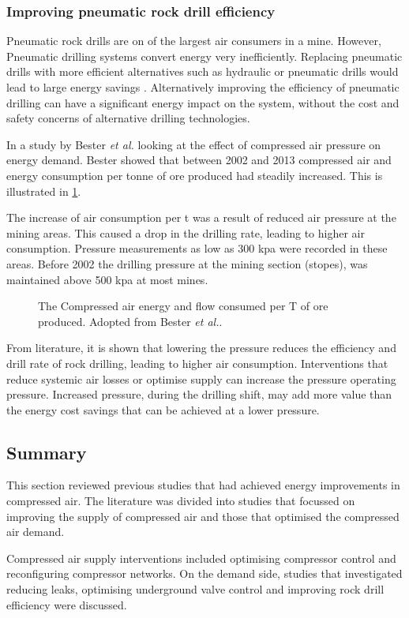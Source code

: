 		\subsubsection{Improving pneumatic rock drill efficiency}
		 Pneumatic rock drills are on of the largest air consumers in a mine. However, Pneumatic drilling systems convert energy very inefficiently. Replacing pneumatic drills with more efficient alternatives such as hydraulic or pneumatic drills would lead to large energy savings \cite{Pascoe2016Masters}. Alternatively improving the efficiency of pneumatic drilling can have a significant energy impact on the system, without the cost and safety concerns of alternative drilling technologies.
		 \par 
		 In a study by Bester \textit{et al.} \cite{bester2013effect} looking at the effect of compressed air pressure on energy demand. Bester showed that between 2002 and 2013 compressed air and energy consumption per tonne of ore produced had steadily increased. This is illustrated in \cref{fig: Compressed energy and air flow per ton}. 
		 \par
		 The increase of air consumption per \gls{t} was a result of reduced air pressure at the mining areas. This caused a drop in the drilling rate, leading to higher air consumption. Pressure measurements as low as 300 \gls{kpa} were recorded in these areas. Before 2002 the drilling pressure at the mining section (stopes), was maintained above 500 \gls{kpa} at most mines. 
		 \par 
		 \begin{figure}[h]
		 	\centering
		 	
		 	\caption[The Compressed air energy and flow consumed per T of ore produced.]{The Compressed air energy and flow consumed per T of ore produced. Adopted from Bester \textit{et al.}\cite{bester2013effect}.}
		 	\label{fig: Compressed energy and air flow per ton}
		 \end{figure}
		 From literature, it is shown that lowering the pressure reduces the efficiency and drill rate of rock drilling, leading to higher air consumption. Interventions that reduce systemic air losses or optimise supply can increase the pressure operating pressure. Increased pressure, during the drilling shift, may add more value than the energy cost savings that can be achieved at a lower pressure.
	\subsection{Summary}
	This section reviewed previous studies that had achieved energy improvements in compressed air. The literature was divided into studies that focussed on improving the supply of compressed air and those that optimised the compressed air demand.
	\par
	Compressed air supply interventions included optimising compressor control and reconfiguring compressor networks. On the demand side, studies that investigated reducing leaks, optimising underground valve control and improving rock drill efficiency were discussed.
